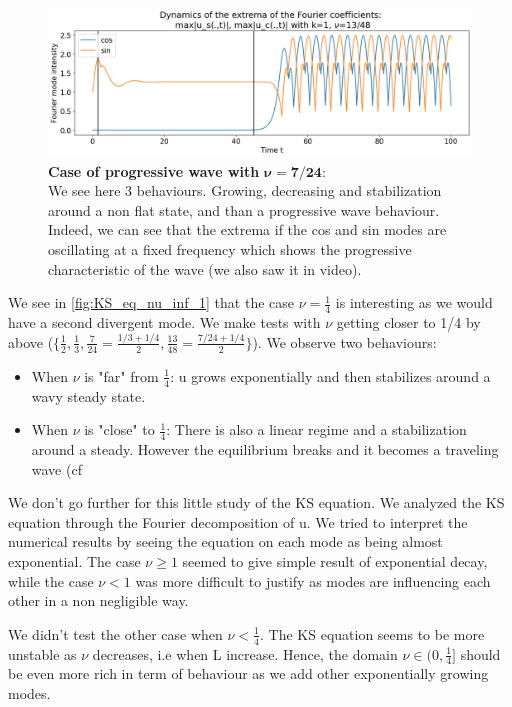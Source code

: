 \documentclass[12pt]{article}
\begin{document}
\begin{figure}[h]
\centering
\includegraphics[width=1\textwidth]{KS_eq/KS_extrema_Fourier_coef.png}
\caption{\textbf{Case of progressive wave with }$\boldsymbol{\nu=7/24}$: \\ We see here 3 behaviours. Growing, decreasing and stabilization around a non flat state, and than a progressive wave behaviour. Indeed, we can see that the extrema if the cos and sin modes are oscillating at a fixed frequency which shows the progressive characteristic of the wave (we also saw it in video).}
\label{fig:KS_eq_nu_inf_1}
\end{figure}


We see in \eqref{fig:KS_eq_nu_inf_1} that the case $\nu=\frac{1}{4}$ is interesting as we would have a second divergent mode. We make tests with $\nu$ getting closer to 1/4 by above ($\{\frac{1}{2}, \frac{1}{3}, \frac{7}{24} = \frac{1/3+1/4}{2}, \frac{13}{48} = \frac{7/24 + 1/4}{2}\}$). We observe two behaviours:
\begin{itemize}
    \item When $\nu$ is "far" from $\frac{1}{4}$: u grows exponentially and then stabilizes around a wavy steady state.
    \item When $\nu$ is "close" to $\frac{1}{4}$: There is also a linear regime and a stabilization around a steady. However the equilibrium breaks and it becomes a traveling wave (cf 
\end{itemize}


We don't go further for this little study of the KS equation. We analyzed the KS equation through the Fourier decomposition of u. We tried to interpret the numerical results by seeing the equation on each mode as being almost exponential. The case $\nu \geq1$ seemed to give simple result of exponential decay, while the case $\nu <1$ was more difficult to justify as modes are influencing each other in a non negligible way. 

We didn't test the other case when $\nu <\frac{1}{4}$. The KS equation seems to be more unstable as $\nu$ decreases, i.e when L increase. Hence, the domain $\nu \in (0,\frac{1}{4}] $ should be even more rich in term of behaviour as we add other exponentially growing modes.
\end{document}
